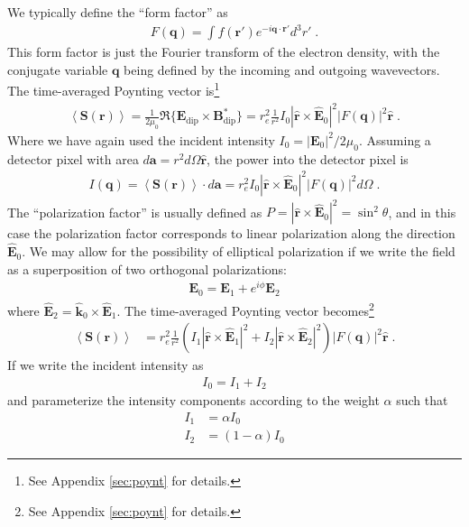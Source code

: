 \documentclass[12pt]{article}
\renewcommand{\vec}[1]{\boldsymbol{#1}}
\newcommand{\hvec}[1]{\hat{\vec{#1}}}
\newcommand{\avg}[1]{\left\langle #1 \right\rangle}
\begin{document}
We typically define the ``form factor'' as
\begin{align}
 F(\vec{q}) = \int f(\vec{r}') e^{-i\vec{q}\cdot\vec{r}'} d^3r' \;.
\end{align}
This form factor is just the Fourier transform of the electron density, with the conjugate variable $\vec{q}$ being defined by the incoming and outgoing wavevectors.  The time-averaged Poynting vector is\footnote{See Appendix \ref{sec:poynt} for details.}
\begin{align}
\avg{\vec{S}(\vec{r})} = \frac{1}{2\mu_0} \Re\{\vec{E}_\text{dip}\times\vec{B}_\text{dip}^*\} = r_e^2 \frac{1}{r^2} I_0 | \hvec{r} \times  \hvec{E}_0 |^2 \left| F(\vec{q}) \right|^2 \hvec{r} \;.
\end{align}
Where we have again used the incident intensity $I_0 = |\vec{E}_0|^2/2\mu_0$.  Assuming a detector pixel with area $d\vec{a} = r^2 d\Omega \hvec{r}$, the power into the detector pixel is
\begin{align}
I(\vec{q}) = \avg{\vec{S}(\vec{r})} \cdot d\vec{a} = r_e^2 I_0 | \hvec{r} \times  \hvec{E}_0 |^2 \left| F(\vec{q}) \right|^2 d\Omega\;.
\end{align}
The ``polarization factor'' is usually defined as $P=| \hvec{r} \times  \hvec{E}_0 |^2=\sin^2\theta$, and in this case the polarization factor corresponds to linear polarization along the direction $\hvec{E}_0$.  We may allow for the possibility of
elliptical polarization if we write the field as a superposition of two orthogonal polarizations:
\begin{align}
 \vec{E}_0 = \vec{E}_1 + e^{i\phi}\vec{E}_2 
\end{align}
where $\hvec{E}_2 = \hvec{k}_0 \times \hvec{E}_1$.  The time-averaged Poynting vector becomes\footnote{See Appendix \ref{sec:poynt} for details.}
\begin{align}
\avg{\vec{S}(\vec{r})} &= r_e^2 \frac{1}{r^2} (I_1 | \hvec{r} \times  \hvec{E}_1 |^2 + I_2 | \hvec{r} \times  \hvec{E}_2 |^2) \left| F(\vec{q}) \right|^2 \hvec{r} \;. %
\end{align}
If we write the incident intensity as 
\begin{align}
 I_0 = I_1 + I_2 
\end{align}
and parameterize the intensity components according to the weight $\alpha$ such that
\begin{align}
 I_1 &=\alpha I_0\\
 I_2 &= (1-\alpha)I_0
\end{align}
\end{document}
